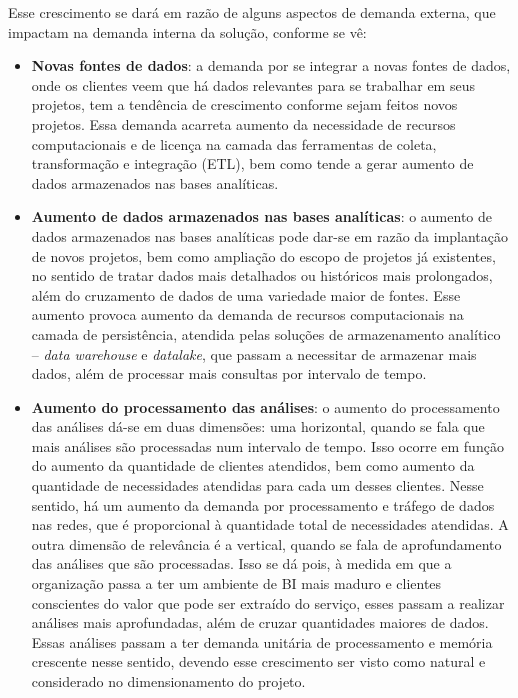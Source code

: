 Esse crescimento se dará em razão de alguns aspectos de demanda externa, que impactam na demanda interna da solução, conforme se vê:
\begin{itemize}
    \item \textbf{Novas fontes de dados}: a demanda por se integrar a novas fontes de dados, onde os clientes veem que há dados relevantes para se trabalhar em seus projetos, tem a tendência de crescimento conforme sejam feitos novos projetos. Essa demanda acarreta aumento da necessidade de recursos computacionais e de licença na camada das ferramentas de coleta, transformação e integração (ETL), bem como tende a gerar aumento de dados armazenados nas bases analíticas.
    \item \textbf{Aumento de dados armazenados nas bases analíticas}: o aumento de dados armazenados nas bases analíticas pode dar-se em razão da implantação de novos projetos, bem como ampliação do escopo de projetos já existentes, no sentido de tratar dados mais detalhados ou históricos mais prolongados, além do cruzamento de dados de uma variedade maior de fontes. Esse aumento provoca aumento da demanda de recursos computacionais na camada de persistência, atendida pelas soluções de armazenamento analítico -- \emph{data warehouse} e \emph{datalake}, que passam a necessitar de armazenar mais dados, além de processar mais consultas por intervalo de tempo.
    \item \textbf{Aumento do processamento das análises}: o aumento do processamento das análises dá-se em duas dimensões: uma horizontal, quando se fala que mais análises são processadas num intervalo de tempo. Isso ocorre em função do aumento da quantidade de clientes atendidos, bem como aumento da quantidade de necessidades atendidas para cada um desses clientes. Nesse sentido, há um aumento da demanda por processamento e tráfego de dados nas redes, que é proporcional à quantidade total de necessidades atendidas. A outra dimensão de relevância é a vertical, quando se fala de aprofundamento das análises que são processadas. Isso se dá pois, à medida em que a organização passa a ter um ambiente de BI mais maduro e clientes conscientes do valor que pode ser extraído do serviço, esses passam a realizar análises mais aprofundadas, além de cruzar quantidades maiores de dados. Essas análises passam a ter demanda unitária de processamento e memória crescente nesse sentido, devendo esse crescimento ser visto como natural e considerado no dimensionamento do projeto.
\end{itemize}

